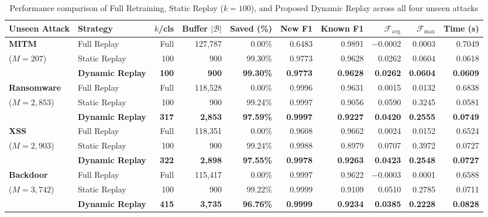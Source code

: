 \begin{table}[htbp]
\centering
\scriptsize
\setlength{\tabcolsep}{3.5pt}
\renewcommand{\arraystretch}{1.25}
\caption{Performance comparison of Full Retraining, Static Replay ($k=100$), and Proposed Dynamic Replay across all four unseen attacks}
\label{tab:phase9_master_comparison}
\begin{tabular}{|l|l|r|r|r|r|r|r|r|r|}
\hline
\textbf{Unseen Attack} & \textbf{Strategy} & \textbf{$k$/cls} & \textbf{Buffer $|\mathcal{B}|$} & \textbf{Saved (\%)} & \textbf{New F1} & \textbf{Known F1} & $\mathcal{F}_{\text{avg}}$ & $\mathcal{F}_{\max}$ & \textbf{Time (s)} \\ \hline
\textbf{MITM}       & Full Replay    & Full & 127{,}787 & 0.00\%  & 0.6483 & 0.9891 & $-0.0002$ & 0.0003 & 0.7049 \\
($M = 207$)         & Static Replay  & 100  & 900       & 99.30\% & 0.9773 & 0.9628 & 0.0262    & 0.0604 & 0.0618 \\
                    & \textbf{Dynamic Replay} & \textbf{100} & \textbf{900} & \textbf{99.30\%} & \textbf{0.9773} & \textbf{0.9628} & \textbf{0.0262} & \textbf{0.0604} & \textbf{0.0609} \\ \hline
\textbf{Ransomware} & Full Replay    & Full & 118{,}528 & 0.00\%  & 0.9996 & 0.9631 & 0.0015    & 0.0132 & 0.6838 \\
($M = 2{,}853$)     & Static Replay  & 100  & 900       & 99.24\% & 0.9997 & 0.9056 & 0.0590    & 0.3245 & 0.0581 \\
                    & \textbf{Dynamic Replay} & \textbf{317} & \textbf{2{,}853} & \textbf{97.59\%} & \textbf{0.9997} & \textbf{0.9227} & \textbf{0.0420} & \textbf{0.2555} & \textbf{0.0749} \\ \hline
\textbf{XSS}        & Full Replay    & Full & 118{,}351 & 0.00\%  & 0.9608 & 0.9662 & 0.0024    & 0.0152 & 0.6524 \\
($M = 2{,}903$)     & Static Replay  & 100  & 900       & 99.24\% & 0.9988 & 0.8979 & 0.0707    & 0.3972 & 0.0727 \\
                    & \textbf{Dynamic Replay} & \textbf{322} & \textbf{2{,}898} & \textbf{97.55\%} & \textbf{0.9978} & \textbf{0.9263} & \textbf{0.0423} & \textbf{0.2548} & \textbf{0.0727} \\ \hline
\textbf{Backdoor}   & Full Replay    & Full & 115{,}417 & 0.00\%  & 0.9997 & 0.9622 & $-0.0003$ & 0.0001 & 0.6588 \\
($M = 3{,}742$)     & Static Replay  & 100  & 900       & 99.22\% & 0.9999 & 0.9109 & 0.0510    & 0.2785 & 0.0711 \\
                    & \textbf{Dynamic Replay} & \textbf{415} & \textbf{3{,}735} & \textbf{96.76\%} & \textbf{0.9999} & \textbf{0.9234} & \textbf{0.0385} & \textbf{0.2228} & \textbf{0.0828} \\ \hline
\end{tabular}
\end{table}

